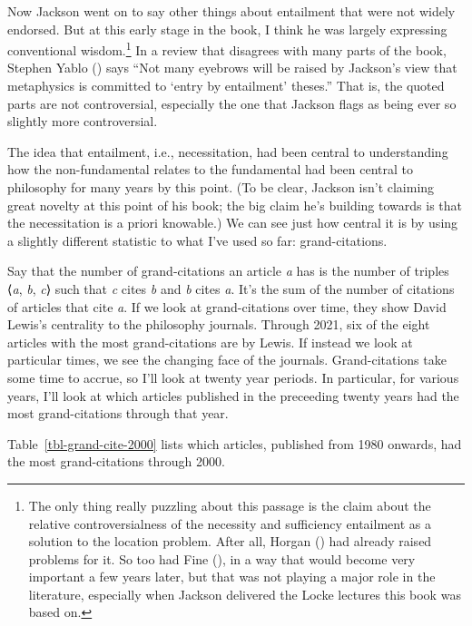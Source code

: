 \documentclass[
  12pt,
  letterpaper,
  DIV=11,
  numbers=noendperiod]{scrartcl}
\begin{document}
Now Jackson went on to say other things about entailment that were not
widely endorsed. But at this early stage in the book, I think he was
largely expressing conventional wisdom.\footnote{The only thing really
  puzzling about this passage is the claim about the relative
  controversialness of the necessity and sufficiency entailment as a
  solution to the location problem. After all, Horgan
  () had already raised problems
  for it. So too had Fine (), in a way
  that would become very important a few years later, but that was not
  playing a major role in the literature, especially when Jackson
  delivered the Locke lectures this book was based on.} In a review that
disagrees with many parts of the book, Stephen Yablo
() says ``Not many eyebrows
will be raised by Jackson's view that metaphysics is committed to `entry
by entailment' theses.'' That is, the quoted parts are not
controversial, especially the one that Jackson flags as being ever so
slightly more controversial.

The idea that entailment, i.e., necessitation, had been central to
understanding how the non-fundamental relates to the fundamental had
been central to philosophy for many years by this point. (To be clear,
Jackson isn't claiming great novelty at this point of his book; the big
claim he's building towards is that the necessitation is a priori
knowable.) We can see just how central it is by using a slightly
different statistic to what I've used so far: grand-citations.

Say that the number of grand-citations an article \emph{a} has is the
number of triples ⟨\emph{a}, \emph{b}, \emph{c}⟩ such that \emph{c}
cites \emph{b} and \emph{b} cites \emph{a}. It's the sum of the number
of citations of articles that cite \emph{a}. If we look at
grand-citations over time, they show David Lewis's centrality to the
philosophy journals. Through 2021, six of the eight articles with the
most grand-citations are by Lewis. If instead we look at particular
times, we see the changing face of the journals. Grand-citations take
some time to accrue, so I'll look at twenty year periods. In particular,
for various years, I'll look at which articles published in the
preceeding twenty years had the most grand-citations through that year.

Table~\ref{tbl-grand-cite-2000} lists which articles, published from
1980 onwards, had the most grand-citations through 2000.
\end{document}
